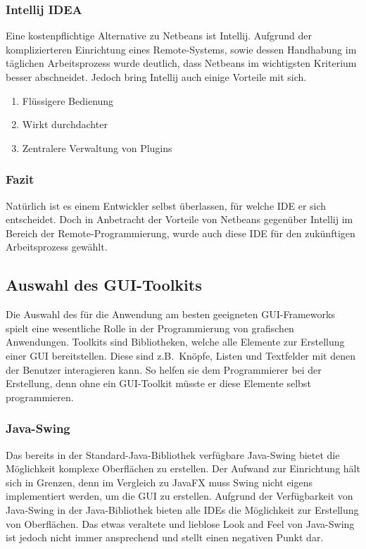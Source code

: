 \subsubsection{Intellij IDEA}
Eine kostenpflichtige Alternative zu Netbeans ist Intellij.
Aufgrund der komplizierteren Einrichtung eines Remote-Systems, sowie dessen Handhabung im täglichen Arbeitsprozess wurde deutlich, dass Netbeans im wichtigsten Kriterium besser abschneidet.
Jedoch bring Intellij auch einige Vorteile mit sich.
\begin{enumerate}
    \item Flüssigere Bedienung
    \item Wirkt durchdachter
    \item Zentralere Verwaltung von Plugins
\end{enumerate}
\subsubsection{Fazit}
Natürlich ist es einem Entwickler selbst überlassen, für welche IDE er sich entscheidet.
Doch in Anbetracht der Vorteile von Netbeans gegenüber Intellij im Bereich der Remote-Programmierung, wurde auch diese IDE für den zukünftigen Arbeitsprozess gewählt.
\subsection{Auswahl des GUI-Toolkits}\label{subsec:auswahl-des-gui-frameworks}
Die Auswahl des für die Anwendung am besten geeigneten GUI-Frameworks spielt eine wesentliche Rolle in der Programmierung von grafischen Anwendungen.
Toolkits sind Bibliotheken, welche alle Elemente zur Erstellung einer GUI bereitstellen.
Diese sind z.B.\ Knöpfe, Listen und Textfelder mit denen der Benutzer interagieren kann.
So helfen sie dem Programmierer bei der Erstellung, denn ohne ein GUI-Toolkit müsste er diese Elemente selbst programmieren.
\subsubsection{Java-Swing}
Das bereits in der Standard-Java-Bibliothek verfügbare Java-Swing bietet die Möglichkeit komplexe Oberflächen zu erstellen.
Der Aufwand zur Einrichtung hält sich in Grenzen, denn im Vergleich zu JavaFX muss Swing nicht eigens implementiert werden, um die GUI zu erstellen.
Aufgrund der Verfügbarkeit von Java-Swing in der Java-Bibliothek bieten alle IDEs die Möglichkeit zur Erstellung von Oberflächen.
Das etwas veraltete und lieblose Look and Feel von Java-Swing ist jedoch nicht immer ansprechend und stellt einen negativen Punkt dar.
